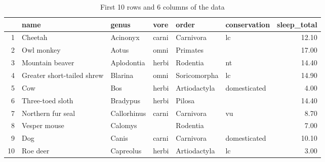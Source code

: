 \begin{table}[h]
\centering
\footnotesize
\ttfamily
\begin{tabular}{rlllllr}
  \hline
 & name & genus & vore & order & conservation & sleep\_total \\ 
  \hline
1 & Cheetah & Acinonyx & carni & Carnivora & lc & 12.10 \\ 
  2 & Owl monkey & Aotus & omni & Primates &  & 17.00 \\ 
  3 & Mountain beaver & Aplodontia & herbi & Rodentia & nt & 14.40 \\ 
  4 & Greater short-tailed shrew & Blarina & omni & Soricomorpha & lc & 14.90 \\ 
  5 & Cow & Bos & herbi & Artiodactyla & domesticated & 4.00 \\ 
  6 & Three-toed sloth & Bradypus & herbi & Pilosa &  & 14.40 \\ 
  7 & Northern fur seal & Callorhinus & carni & Carnivora & vu & 8.70 \\ 
  8 & Vesper mouse & Calomys &  & Rodentia &  & 7.00 \\ 
  9 & Dog & Canis & carni & Carnivora & domesticated & 10.10 \\ 
  10 & Roe deer & Capreolus & herbi & Artiodactyla & lc & 3.00 \\ 
   \hline
\end{tabular}
\rmfamily
\caption{First 10 rows and 6 columns of the  data}
\label{table:msleep}
\end{table}
